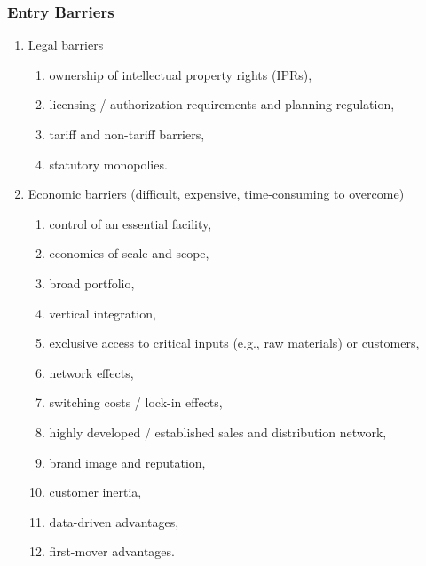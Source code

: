 
        \subsubsection{Entry Barriers}

            \begin{enumerate}
                \item Legal barriers
                \begin{enumerate}[label=\alph*.]
                    \item ownership of intellectual property rights (IPRs),
                    \item licensing / authorization requirements and planning regulation,
                    \item tariff and non-tariff barriers,
                    \item statutory monopolies.
                \end{enumerate}
                
                \item Economic barriers (difficult, expensive, time-consuming to overcome)
                \begin{enumerate}[label=\alph*.]
                    \item control of an essential facility,
                    \item economies of scale and scope,
                    \item broad portfolio,
                    \item vertical integration,
                    \item exclusive access to critical inputs (e.g., raw materials) or customers,
                    \item network effects,
                    \item switching costs / lock-in effects,
                    \item highly developed / established sales and distribution network,
                    \item brand image and reputation,
                    \item customer inertia,
                    \item data-driven advantages,
                    \item first-mover advantages.
                \end{enumerate}
            \end{enumerate}

